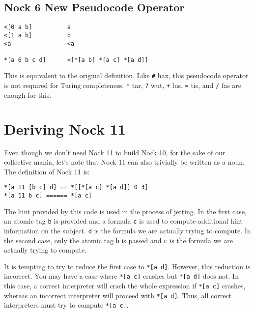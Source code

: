 \documentclass[twoside]{article}
\begin{document}
\subsection*{Nock 6 New Pseudocode Operator}

\begin{lstlisting}[style=listingcode]
<[0 a b]          a
<[1 a b]          b
<a                <a

*[a 6 b c d]      <[*[a b] *[a c] *[a d]]
\end{lstlisting}

This is equivalent to the original definition. Like \lstinline[style=inlinecode]{#} hax, this pseudocode operator is not required for Turing completeness. \lstinline[style=inlinecode]{*} tar, \lstinline[style=inlinecode]{?} wut, \lstinline[style=inlinecode]{+} lus, \lstinline[style=inlinecode]{=} tis, and \lstinline[style=inlinecode]{/} fas are enough for this. 

\section{Deriving Nock 11}

Even though we don't need Nock 11 to build Nock 10, for the sake of our collective mania, let's note that Nock 11 can also trivially be written as a noun. The definition of Nock 11 is:

\begin{lstlisting}[style=listingcode]
*[a 11 [b c] d] == *[[*[a c] *[a d]] 0 3]
*[a 11 b c] ====== *[a c]
\end{lstlisting}

The hint provided by this code is used in the process of jetting. In the first case, an atomic tag \lstinline[style=inlinecode]{b} is provided and a formula \lstinline[style=inlinecode]{c} is used to compute additional hint information on the subject. \lstinline[style=inlinecode]{d} is the formula we are actually trying to compute. In the second case, only the atomic tag \lstinline[style=inlinecode]{b} is passed and \lstinline[style=inlinecode]{c} is the formula we are actually trying to compute.

It is tempting to try  to reduce the first case to \lstinline[style=inlinecode]{*[a d]}. However, this reduction is incorrect. You may have a case where \lstinline[style=inlinecode]{*[a c]} crashes but \lstinline[style=inlinecode]{*[a d]} does not. In this case, a correct interpreter will crash the whole expression if \lstinline[style=inlinecode]{*[a c]} crashes, whereas an incorrect interpreter will proceed with \lstinline[style=inlinecode]{*[a d]}. Thus, all correct interpreters must try
to compute \lstinline[style=inlinecode]{*[a c]}.
\end{document}
